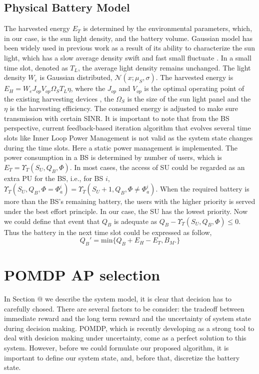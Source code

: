 \documentclass[conference]{IEEEtran}
\makeatletter
\newcommand{\Rmnum}[1]{\expandafter\@slowromancap\romannumeral #1@}
\makeatother
\begin{document}
\subsection{Physical Battery Model}
The harvested energy \(E_T\) is determined by the environmental parameters, 
which, in our case, is the sun light density, and the battery volume.
Gaussian model has been widely used in previous work as a result of its ability to characterize the sun light,
which has a slow average density swift and fast small fluctuate \cite{}.
In a small time slot, denoted as \(T_L\), the average light density remains unchanged. 
The light density \(W_e\) is Gaussian distributed, \(\mathcal{N}\left(x;\mu_S,\sigma\right)\).
The harvested energy is \(E_H = W_eJ_{op}V_{op}\Omega_ST_L\eta\), 
where the \(J_{op}\) and \(V_{op}\) is the optimal operating point of the existing harvesting devices \cite{}, 
the \(\Omega_S\) is the size of the sun light panel and the \(\eta\) is the harvesting efficiency.
The consumed energy is adjusted to make sure transmission with certain SINR.
It is important to note that from the BS perspective, current feedback-based iteration algorithm
that evolves several time slots 
like Inner Loop Power Management is not valid as the system state changes during the time slots.
Here a static power management is implemented. 
The power consumption in a BS is determined by number of users, which is \(E_T = \Upsilon_T(S_U, Q_B, \Phi)\).
In most cases, the access of SU could be regarded as an extra PU for the BS, i.e., for BS \(i\),
\(\Upsilon_T(S_U, Q_B, \Phi = \Phi_{a}^{i}) = \Upsilon_T(S_U + 1, Q_B, \Phi \ne \Phi_{a}^i)\).
When the required battery is more than the BS's remaining battery,
the users with the higher priority is served under the best effort principle.
In our case, the SU has the lowest priority.
Now we could define that event that \(Q_B\) is adequate as \(Q_B- \Upsilon_T(S_U, Q_B, \Phi) \leq 0\).
Thus the battery in the next time slot could be expressed as follow,
\begin{equation}
	Q_B' = \mbox{min}\{Q_B + E_H - E_T, B_M.\}
\end{equation}
\section{POMDP AP selection}
In Section \Rmnum{2} we describe the system model, it is clear that decision has to carefully chosed.
There are several factors to be consider: the tradeoff between immediate reward and the long term reward and 
the uncertainty of system state during decision making.
POMDP, which is recently developing as a strong tool to deal with desicion making under uncertainty,
come as a perfect solution to this system. 
However, before we could formulate our proposed algorithm, it is important to define our system state,
and, before that, discretize the battery state.
\end{document}
